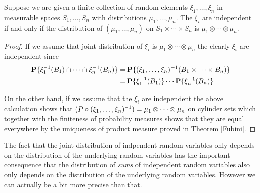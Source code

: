 \begin{lem}\label{IndependenceProductMeasures}Suppose we are given a finite collection of
  random elements $\xi_1, \dots, \xi_n$ in measurable spaces
  $S_1, \dots, S_n$ with distributions $\mu_1, \dots, \mu_n$.  The
  $\xi_i$ are independent if and only if the distribution of $(\mu_1,
  \dots, \mu_n)$ on $S_1 \times \cdots \times S_n$ is $\mu_1 \otimes
  \cdots \otimes \mu_n$.
\end{lem}
\begin{proof}If we assume that joint distribution of $\xi_i$ is $\mu_1 \otimes
  \cdots \otimes \mu_n$ the clearly $\xi_i$ are independent since 
\begin{align*}
\probability{\xi_1^{-1}(B_1) \cap \cdots \cap \xi_n^{-1}(B_n)} &=
\probability{(\xi_1, \dots, \xi_n)^{-1}(B_1 \times \cdots \times B_n)}
  \\
&=\probability{\xi_1^{-1}(B_1)} \cdots \probability{\xi_n^{-1}(B_n)}
\end{align*}

On the other hand, if we assume that the $\xi_i$ are independent the
above calculation shows that $(\pushforward{(\xi_1, \dots, \xi_n)}{P}) =
\mu_1 \otimes \cdots \otimes \mu_n$ on cylinder sets which together
with the finiteness of probability measures shows that
they are equal everywhere by the uniqueness of product measure proved
in Theorem \ref{Fubini}.
\end{proof}

The fact that the joint distribution of indpendent random variables
only depends on the distribution of the underlying random variables
has the important consequence that the distribution of \emph{sums} of
independent random variables also only depends on the distribution of
the underlying random variables.  However we can actually be a bit
more precise than that.

